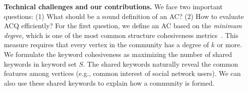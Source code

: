{\bf Technical challenges and our contributions.}
We face two important questions: (1) What should be a sound definition of an AC? (2) How to evaluate ACQ efficiently?  For the first question, we define an AC based on the {\it minimum degree}, which is one of the most common structure cohesiveness metrics~\cite{community-phy2004,community-phy2010,KDD2010,local2014}. This measure requires that every vertex in the community has a degree of $k$ or more.
We formulate the keyword cohesiveness as maximizing the number of shared keywords in keyword set $S$. The shared keywords naturally reveal the common features among vertices (e.g., common interest of social network users). We can also use these shared keywords to explain how a community is formed.

